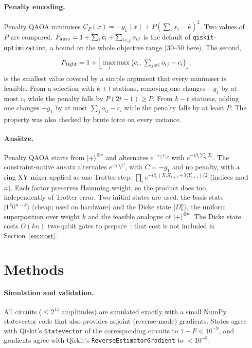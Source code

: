 \documentclass[11pt,a4paper]{article}
\newcommand{\Pauto}{P_{\rm auto}}
\newcommand{\Ptight}{P_{\rm tight}}
\begin{document}
\paragraph{Penalty encoding.} Penalty QAOA minimises $C_P(x)=-g_1(x)+P(\sum_ix_i-k)^2$. Two values
of $P$ are compared. $\Pauto=1+\sum_i c_i+\sum_{i<j}o_{ij}$ is the default of
\texttt{qiskit-optimization}, a bound on the whole objective range (30--50 here). The second,
\begin{equation}
\Ptight = 1+\Big\lfloor \max_i \max\big(c_i,\;\textstyle\sum_{j\ne i}o_{ij}-c_i\big)\Big\rfloor ,
\end{equation}
is the smallest value covered by a simple argument that every minimiser is feasible. From a
selection with $k+t$ stations, removing one changes $-g_1$ by at most $c_i$ while the penalty
falls by $P(2t-1)\ge P$. From $k-t$ stations, adding one changes $-g_1$ by at most
$\sum_j o_{ij}-c_i$ while the penalty falls by at least $P$. The property was also checked by brute
force on every instance.

\paragraph{Ansätze.} Penalty QAOA starts from $|+\rangle^{\otimes n}$ and alternates $e^{-i\gamma_l C_P}$ with
$e^{-i\beta_l\sum_iX_i}$. The constraint-native ansatz alternates $e^{-i\gamma_l C}$, with $C=-g_1$ and
no penalty, with a ring XY mixer applied as one Trotter step,
$\prod_{i}e^{-i\beta_l(X_iX_{i+1}+Y_iY_{i+1})/2}$ (indices mod $n$). Each factor preserves Hamming weight,
so the product does too, independently of Trotter error. Two initial states are used: the basis
state $|1^k0^{n-k}\rangle$ (cheap; used on hardware) and the Dicke state $|D^n_k\rangle$, the uniform
superposition over weight $k$ and the feasible analogue of $|+\rangle^{\otimes n}$. The Dicke state costs
$O(kn)$ two-qubit gates to prepare~\cite{baertschi2019}; that cost is not included in
Section~\ref{sec:cost}.

\section{Methods}
\paragraph{Simulation and validation.} All circuits ($\le 2^{14}$ amplitudes) are simulated exactly
with a small NumPy statevector code that also provides adjoint (reverse-mode) gradients. States
agree with Qiskit's \texttt{Statevector} of the corresponding circuits to $1-F<10^{-9}$, and
gradients agree with Qiskit's \texttt{ReverseEstimatorGradient} to $<10^{-8}$.
\end{document}
